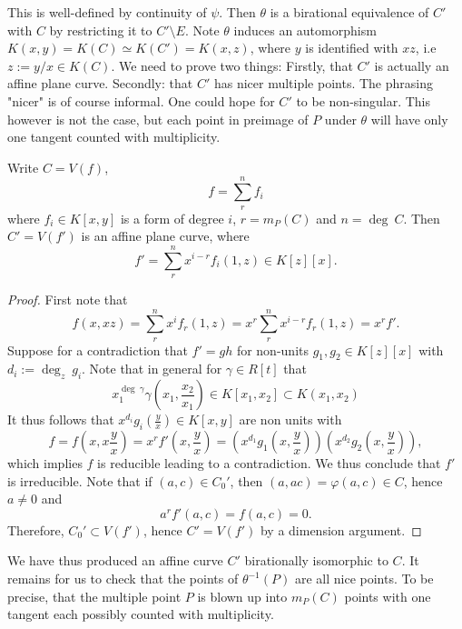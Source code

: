         This is well-defined by continuity of $\psi$.
        Then $\theta$ is a birational equivalence of $C'$ with $C$ by restricting it to $C'\setminus E$. Note $\theta$ induces an automorphism $K(x,y)=K(C)\simeq K(C')=K(x,z)$, where $y$ is identified with $xz$, i.e $z:= y/x\in K(C)$. We need to prove two things: Firstly, that $C'$ is actually an affine plane curve. Secondly: that $C'$ has nicer multiple points. The phrasing "nicer" is of course informal. One could hope for $C'$ to be non-singular. This however is not the case, but each point in preimage of $P$ under $\theta$ will have only one tangent counted with multiplicity. 
        \begin{lemma}
            Write $C=V(f)$, 
            $$f=\sum_r^n f_i$$
            where $f_i\in K[x,y]$ is a form of degree $i$, $r=m_P(C)$ and $n=\deg\ C$. Then $C'=V(f')$ is an affine plane curve, where
            $$f' = \sum_r^n x^{i-r}f_i(1,z)\in K[z][x].$$ 
        \end{lemma}
        \begin{proof}
            First note that 
            $$
                f(x,xz) = \sum_r^n x^if_r(1,z) = x^r \sum_r^n x^{i-r} f_r(1,z) = x^rf'. 
            $$
            Suppose for a contradiction that $f'= gh$ for non-units $g_1,g_2\in K[z][x]$ with $d_i := \deg_z \ g_i$. Note that in general for $\gamma \in R[t]$ that 
            $$
                x_1^{\deg \ \gamma}\gamma\left(x_1,\frac{x_2}{x_1}\right)\in K[x_1,x_2]\subset K(x_1,x_2) 
            $$
            It thus follows that $x^{d_i} g_i\left(\frac{y}{x}\right)\in K[x,y]$ are non units with 
            $$
                f = f\left(x,x\frac{y}{x}\right) = x^rf'\left(x,\frac{y}{x}\right) = \left(x^{d_1}g_1\left(x,\frac{y}{x}\right)\right)\left(x^{d_2}g_2\left(x,\frac{y}{x}\right)\right),
            $$
            which implies $f$ is reducible leading to a contradiction. We thus conclude that $f'$ is irreducible. 
            Note that if $(a,c)\in C_0'$, then $(a,ac)=\varphi(a,c)\in C$, hence $a\neq 0$ and  
            $$
                a^rf'(a,c) = f(a,c)=0.
            $$
            Therefore, $C_0'\subset V(f')$, hence $C'=V(f')$ by a dimension argument. 
        \end{proof}
        We have thus produced an affine curve $C'$ birationally isomorphic to $C$. It remains for us to check that the points of $\theta^{-1}(P)$ are all nice points. To be precise, that the multiple point $P$ is blown up into $m_P(C)$ points with one tangent each possibly counted with multiplicity.\\
